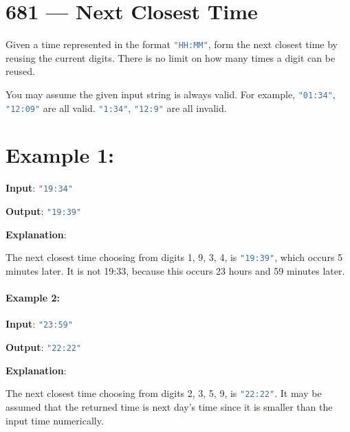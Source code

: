 \section{681 --- Next Closest Time}
Given a time represented in the format \lstinline[language=Java, basicstyle=\small\ttfamily, keywordstyle=\bfseries\color{green!40!black}]|"HH:MM"|, form the next closest time by reusing the current digits. There is no limit on how many times a digit can be reused.

You may assume the given input string is always valid. For example, \lstinline[language=Java, basicstyle=\small\ttfamily, keywordstyle=\bfseries\color{green!40!black}]|"01:34"|, \lstinline[language=Java, basicstyle=\small\ttfamily, keywordstyle=\bfseries\color{green!40!black}]|"12:09"| are all valid. \lstinline[language=Java, basicstyle=\small\ttfamily, keywordstyle=\bfseries\color{green!40!black}]|"1:34"|, \lstinline[language=Java, basicstyle=\small\ttfamily, keywordstyle=\bfseries\color{green!40!black}]|"12:9"| are all invalid.

\section{Example 1:}

\begin{flushleft}

\textbf{Input}: \lstinline[language=Java, basicstyle=\small\ttfamily, keywordstyle=\bfseries\color{green!40!black}]|"19:34"|

\textbf{Output}: \lstinline[language=Java, basicstyle=\small\ttfamily, keywordstyle=\bfseries\color{green!40!black}]|"19:39"|

\textbf{Explanation}: 

The next closest time choosing from digits 1, 9, 3, 4, is \lstinline[language=Java, basicstyle=\small\ttfamily, keywordstyle=\bfseries\color{green!40!black}]|"19:39"|, which occurs 5 minutes later.  It is not 19:33, because this occurs 23 hours and 59 minutes later.

\end{flushleft}

\paragraph{Example 2:}

\begin{flushleft}
\textbf{Input}: \lstinline[language=Java, basicstyle=\small\ttfamily, keywordstyle=\bfseries\color{green!40!black}]|"23:59"|

\textbf{Output}: \lstinline[language=Java, basicstyle=\small\ttfamily, keywordstyle=\bfseries\color{green!40!black}]|"22:22"|

\textbf{Explanation}: 

The next closest time choosing from digits 2, 3, 5, 9, is \lstinline[language=Java, basicstyle=\small\ttfamily, keywordstyle=\bfseries\color{green!40!black}]|"22:22"|. It may be assumed that the returned time is next day's time since it is smaller than the input time numerically.

\end{flushleft}

